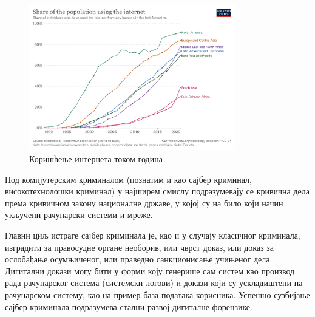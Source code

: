 \documentclass[a4paper]{article}
\begin{document}
        \begin{figure}[h]
        \centering
        \includegraphics[width=0.8\textwidth]{koriscenje-interneta-po-godinama.png}
        \caption{Коришћење интернета током година}
        \label{slike:koriscenjeInterneta}
        \end{figure}
        
        Под компјутерским криминалом (познатим и као сајбер криминал, високотехнолошки криминал)  у најширем смислу подразумевају се кривична дела према кривичном закону националне државе, у којој су на било који начин укључени рачунарски системи и мреже.

        Главни циљ истраге сајбер криминала је, као и у случају класичног криминала, изградити за правосудне органе необорив, или чврст доказ, или доказ за ослобађање осумњиченог, или праведно санкционисање учињеног дела.
        Дигитални докази могу бити у форми коју генерише сам систем као производ рада рачунарског система (системски логови) и докази који су ускладиштени на рачунарском систему, као на пример база података корисника.
        Успешно сузбијање сајбер криминала подразумева стални развој дигиталне форензике. 
        
\end{document}
